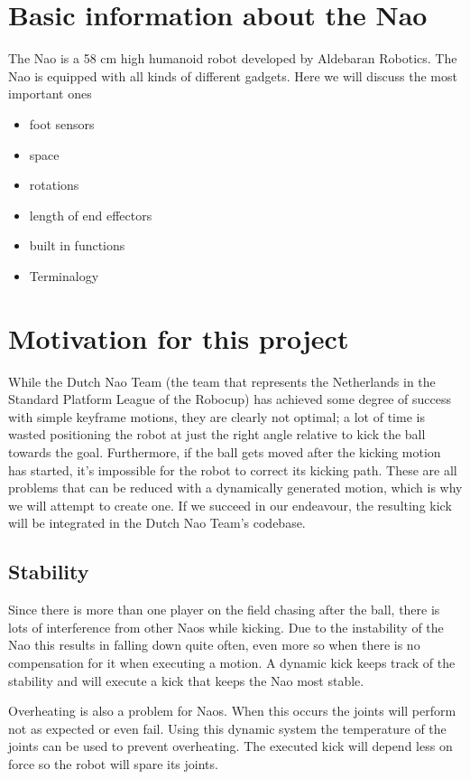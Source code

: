 \documentclass[a4paper]{article}
\begin{document}
\section{Basic information about the Nao}
The Nao is a 58 cm high humanoid robot developed by Aldebaran Robotics. The Nao
is equipped with all kinds of different gadgets. Here we will discuss the most
important ones 
\begin{itemize}
    \item foot sensors
    \item space
    \item rotations
    \item length of end effectors
    \item built in functions
    \item Terminalogy
\end{itemize}


\section{Motivation for this project} 
While the Dutch Nao Team (the team that represents the Netherlands in the Standard Platform League of the Robocup) has achieved some degree of success with simple keyframe motions, they are clearly not optimal; a lot of time is wasted positioning the robot at just the right angle relative to kick the ball towards the goal. Furthermore, if the ball gets moved after the kicking motion has started, it's impossible for the robot to correct its kicking path. These are all problems that can be reduced with a dynamically generated motion, which is why we will attempt to create one. If we succeed in our endeavour, the resulting kick will be integrated in the Dutch Nao Team's codebase.

\subsection{Stability}
Since there is more than one player on
the field  chasing after the ball,
there is lots of interference from other Naos while kicking. Due to the
instability of the Nao this results in falling down quite often, even more
so when there is no compensation for it when executing a motion. A dynamic
kick keeps track of the stability and will execute a kick that keeps the Nao
most stable.

Overheating is also a problem for Naos. When this occurs the joints will perform
not as expected or even fail. Using this dynamic system the temperature of the
joints can be used to prevent overheating. The executed kick will depend less
on force so the robot will spare its joints.
\end{document}
